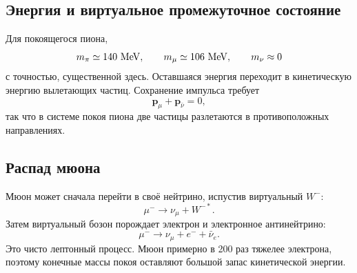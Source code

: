 \subsection{Энергия и виртуальное промежуточное состояние}

Для покоящегося пиона,
\begin{equation}
m_\pi\simeq140\ {\rm MeV},
\qquad
m_\mu\simeq106\ {\rm MeV},
\qquad
m_\nu\approx0
\end{equation}
с точностью, существенной здесь. Оставшаяся энергия переходит в кинетическую энергию
вылетающих частиц. Сохранение импульса требует
\begin{equation}
\boldsymbol p_\mu+\boldsymbol p_{\bar\nu}=0,
\end{equation}
так что в системе покоя пиона две частицы разлетаются в противоположных направлениях.

\begin{classroomqa}
\end{classroomqa}

\subsection{Распад мюона}

Мюон может сначала перейти в своё нейтрино, испустив виртуальный \(W^-\):
\begin{equation}
\mu^-\longrightarrow\nu_\mu+W^{-*}.
\end{equation}
Затем виртуальный бозон порождает электрон и электронное антинейтрино:
\begin{equation}
\mu^-\longrightarrow
\nu_\mu+e^-+\bar\nu_e.
\label{eq:l5-muon-decay}
\end{equation}
Это чисто лептонный процесс. Мюон примерно в 200 раз тяжелее электрона,
поэтому конечные массы покоя оставляют большой запас кинетической энергии.

